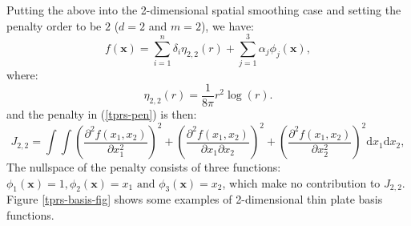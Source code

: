 Putting the above into the 2-dimensional spatial smoothing case and setting the penalty order to be $2$ ($d=2$ and $m=2$), we have:
\begin{equation*}
f(\mathbf{x}) = \sum_{i=1}^n \delta_i \eta_{2,2}(r) + \sum_{j=1}^3 \alpha_j \phi_j(\mathbf{x}),
\end{equation*}
where:
\begin{equation*}
\eta_{2,2}(r) = \frac{1}{8\pi} r^2 \log(r).
\end{equation*}
and the penalty in (\ref{tprs-pen}) is then:
\begin{equation*}
J_{2,2} = \int \int \left ( \frac{\partial^2 f(x_1,x_2)}{\partial x_1^2} \right )^2 + \left ( \frac{\partial^2 f(x_1,x_2)}{\partial x_1  \partial x_2} \right )^2 + \left ( \frac{\partial^2 f(x_1,x_2)}{\partial x_2^2} \right )^2 \text{d} x_1 \text{d} x_2,
\end{equation*}
The nullspace of the penalty consists of three functions: $\phi_1(\mathbf{x})=1, \phi_2(\mathbf{x})=x_1 \text{ and } \phi_3(\mathbf{x})=x_2$, which make no contribution to $J_{2,2}$. Figure \ref{tprs-basis-fig} shows some examples of 2-dimensional thin plate basis functions.


